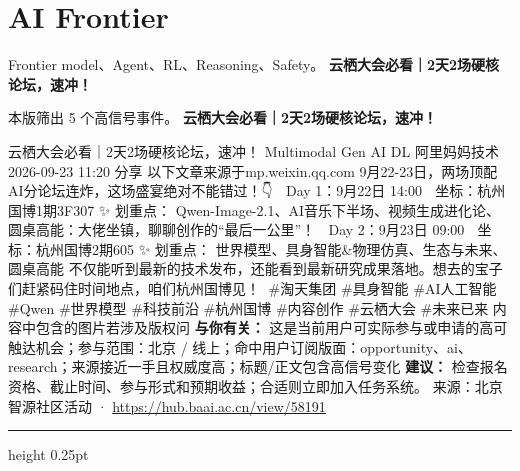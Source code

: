 \documentclass[10.5pt]{ctexart}
\begin{document}
\section*{AI Frontier}
{\color{ormuted} Frontier model、Agent、RL、Reasoning、Safety。}
\vspace{2mm}
{\LARGE\bfseries 云栖大会必看｜2天2场硬核论坛，速冲！}\par
\vspace{1mm}
{\color{ormuted} 本版筛出 5 个高信号事件。}
\vspace{3mm}
{\Large\bfseries 云栖大会必看｜2天2场硬核论坛，速冲！}\par
云栖大会必看｜2天2场硬核论坛，速冲！ Multimodal Gen AI DL 阿里妈妈技术 2026-09-23 11:20 分享 以下文章来源于mp.weixin.qq.com 9月22-23日，两场顶配AI分论坛连炸，这场盛宴绝对不能错过！👇 🎨 Day 1：9月22日 14:00 📍 坐标：杭州国博1期3F307 ✨ 划重点： Qwen-Image-2.1、AI音乐下半场、视频生成进化论、圆桌高能：大佬坐镇，聊聊创作的“最后一公里”！ 🎨 Day 2：9月23日 09:00 📍 坐标：杭州国博2期605 ✨ 划重点： 世界模型、具身智能\&物理仿真、生态与未来、圆桌高能 不仅能听到最新的技术发布，还能看到最新研究成果落地。想去的宝子们赶紧码住时间地点，咱们杭州国博见！👋 \#淘天集团 \#具身智能 \#AI人工智能 \#Qwen \#世界模型 \#科技前沿 \#杭州国博 \#内容创作 \#云栖大会 \#未来已来 内容中包含的图片若涉及版权问
\textbf{与你有关：} 这是当前用户可实际参与或申请的高可触达机会；参与范围：北京 / 线上；命中用户订阅版面：opportunity、ai、research；来源接近一手且权威度高；标题/正文包含高信号变化
\textbf{建议：} 检查报名资格、截止时间、参与形式和预期收益；合适则立即加入任务系统。
{\footnotesize\color{ormuted} 来源：北京智源社区活动 · \url{https://hub.baai.ac.cn/view/58191}}
\vspace{4mm}
\hrule height 0.25pt
\vspace{3mm}
\end{document}
